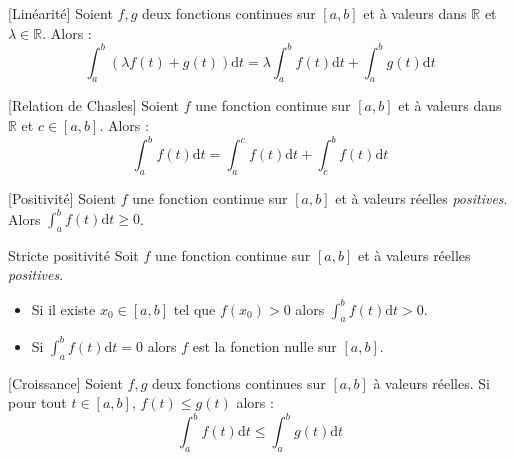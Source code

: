 \documentclass[french,11pt,twoside]{VcCours}
\newcommand{\dt}{\text{d}t}
\newcommand{\Int}[2]{\int_{#1}^{#2}}
\begin{document}
%
%

\begin{Proposition}{}[Linéarité] Soient $f,g$ deux fonctions continues sur $[a,b]$ et à valeurs dans $\mathbb{R}$ et $\lambda \in \mathbb{R}$. Alors :
$$ \int_{a}^b (\lambda f(t) + g(t)) \dt = \lambda \int_{a}^b  f(t) \dt +  \int_{a}^b  g(t) \dt$$
\end{Proposition}

\begin{Proposition}{}[Relation de Chasles] Soient $f$ une fonction continue sur $[a,b]$ et à valeurs dans $\mathbb{R}$ et $c \in [a,b]$. Alors :
$$ \int_{a}^b f(t) \dt = \int_{a}^c f(t) \dt + \int_{c}^b f(t) \dt $$
\end{Proposition}

\begin{Proposition}{}[Positivité] Soient $f$ une fonction continue sur $[a,b]$ et à valeurs réelles \textit{positives}. Alors $\Int{a}{b} f(t) \dt \geq 0$.
\end{Proposition}

\newpage

\begin{Proposition}{Stricte positivité} Soit $f$ une fonction continue sur $[a,b]$ et à valeurs réelles \textit{positives}. 

\begin{itemize}
\item Si il existe $x_0 \in [a,b]$ tel que $f(x_0)>0$ alors $\Int{a}{b} f(t) \dt>0$.
\item Si $\Int{a}{b} f(t) \dt =0$ alors $f$ est la fonction nulle sur $[a,b]$.
\end{itemize}
\end{Proposition}

\begin{Proposition}{}[Croissance] Soient $f,g$ deux fonctions continues sur $[a,b]$ à valeurs réelles. Si pour tout $t \in [a,b]$, $f(t) \leq g(t)$ alors :
$$\int_{a}^{b} f(t) \dt  \leq \int_{a}^{b} g(t) \dt $$
\end{Proposition}
\end{document}
